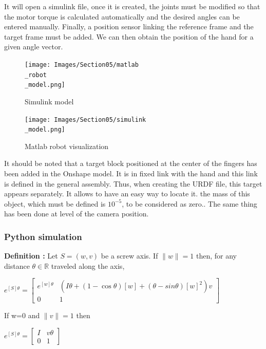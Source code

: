 \bigbreak
It will open a simulink file, once it is created, the joints must be modified so that the motor torque is calculated automatically and the desired angles can be entered manually. Finally, a position sensor linking the reference frame and the target frame must be added. We can then obtain the position of the hand for a given angle vector. 

\bigbreak
\begin{figure}[ht]
    \centering
    \texttt{[image: Images/Section05/matlab\\\_robot\\\_model.png]}
    \caption{Simulink model}
    \label{fig:Simulink}
\end{figure}
\FloatBarrier

\bigbreak
\begin{figure}[ht]
    \centering
    \texttt{[image: Images/Section05/simulink\\\_model.png]}
    \caption{Matlab robot visualization}
    \label{fig:MatlabRobot}
\end{figure}
\FloatBarrier

\bigbreak
It should be noted that a target block positioned at the center of the fingers has been added in the Onshape model. It is in fixed link with the hand and this link is defined in the general assembly. Thus, when creating the URDF file, this target appears separately. It allows to have an easy way to locate it. the mass of this object, which must be defined is $10^{-5}$, to be considered as zero.. The same thing has been done at level of the camera position. 

\subsubsection{Python simulation}

\textbf{Definition :} Let $S = (w,v)$ be a screw axis. If $\|w\|=1$ then, for any distance $\theta\in\mathbb{R}$ traveled along the axis,
\begin{center}
    $e^{[S]\theta}=
    \begin{bmatrix}
        e^{[w]\theta} & (I\theta+(1-\cos\theta)[w]+(\theta-sin\theta)[w]^2)v\\
        0 & 1
    \end{bmatrix}$
\end{center}
If w=0 and $\|v\|=1$ then 
\begin{center}
    $e^{[S]\theta}=\begin{bmatrix}
        I & v\theta\\
        0 & 1
    \end{bmatrix}$
\end{center}

